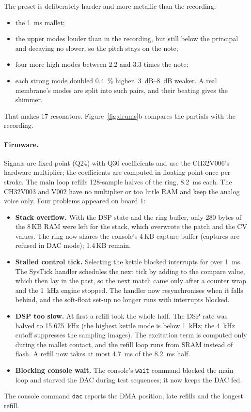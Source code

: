 \documentclass[11pt,a4paper]{article}
\begin{document}
The preset is deliberately harder and more metallic than the recording:
\begin{itemize}
  \item the \SI{1}{ms} mallet;
  \item the upper modes louder than in the recording, but still below the principal and decaying no
    slower, so the pitch stays on the note;
  \item four more high modes between 2.2 and 3.3 times the note;
  \item each strong mode doubled \SI{0.4}{\percent} higher, \SIrange{3}{8}{dB} weaker. A real membrane's
    modes are split into such pairs, and their beating gives the shimmer.
\end{itemize}
That makes 17 resonators. Figure~\ref{fig:drums}b compares the partials with the recording.

\paragraph{Firmware.} Signals are fixed point (Q24) with Q30 coefficients and use the CH32V006's hardware
multiplier; the coefficients are computed in floating point once per stroke. The main loop refills
128-sample halves of the ring, \SI{8.2}{ms} each. The CH32V003 and V002 have no multiplier or too little RAM
and keep the analog voice only. Four problems appeared on board 1:
\begin{itemize}
  \item \textbf{Stack overflow.} With the DSP state and the ring buffer, only 280 bytes of the 8\,KB RAM
    were left for the stack, which overwrote the patch and the CV values. The ring now shares the console's
    4\,KB capture buffer (captures are refused in DAC mode); 1.4\,KB remain.
  \item \textbf{Stalled control tick.} Selecting the kettle blocked interrupts for over \SI{1}{ms}. The
    SysTick handler schedules the next tick by adding to the compare value, which then lay in the past, so
    the next match came only after a counter wrap and the 1~kHz engine stopped. The handler now resynchronises
    when it falls behind, and the soft-float set-up no longer runs with interrupts blocked.
  \item \textbf{DSP too slow.} At first a refill took the whole half. The DSP rate was halved to
    \SI{15.625}{kHz} (the highest kettle mode is below \SI{1}{kHz}; the 4~kHz cutoff suppresses the sampling
    images). The excitation term is computed only during the mallet contact, and the refill loop runs from
    SRAM instead of flash. A refill now takes at most \SI{4.7}{ms} of the \SI{8.2}{ms} half.
  \item \textbf{Blocking console wait.} The console's \texttt{wait} command blocked the main loop and
    starved the DAC during test sequences; it now keeps the DAC fed.
\end{itemize}
The console command \texttt{dac} reports the DMA position, late refills and the longest refill.
\end{document}
